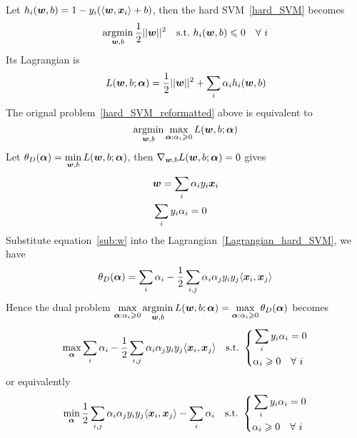 Let $h_i(\boldsymbol{w}, b) = 1 - y_i(\langle \boldsymbol{w}, \boldsymbol{x}_i\rangle + b)$, then the hard SVM~\eqref{hard_SVM} becomes
\begin{equation}\label{hard_SVM_reformatted}
\operatorname*{argmin}_{\boldsymbol{w},b} \frac{1}{2}||\boldsymbol{w}||^2\quad\text{s.t.\ } h_i(\boldsymbol{w}, b) \leqslant 0\quad\forall~i
\end{equation}
Its Lagrangian is
\begin{equation}\label{Lagrangian_hard_SVM}
    L(\boldsymbol{w}, b; \boldsymbol{\alpha}) = \frac{1}{2}||\boldsymbol{w}||^2 + \sum_i \alpha_i h_i(\boldsymbol{w}, b)
\end{equation}
The orignal problem~\eqref{hard_SVM_reformatted} above is equivalent to
$$\operatorname*{argmin}_{\boldsymbol{w}, b}\max_{\boldsymbol{\alpha}: \alpha_i \geqslant 0} L(\boldsymbol{w}, b; \boldsymbol{\alpha})$$
Let $\displaystyle\theta_D(\boldsymbol{\alpha}) = \min_{\boldsymbol{w}, b}L(\boldsymbol{w}, b; \boldsymbol{\alpha})$, then 
$\nabla_{\boldsymbol{w}, b} L(\boldsymbol{w}, b; \boldsymbol{\alpha}) = 0$ gives
\begin{subequations}
    \begin{align}
    &\boldsymbol{w} = \sum_i \alpha_i y_i \boldsymbol{x}_i\label{sub:w}\\
    &\sum_i y_i \alpha_i = 0\label{sub:b}
    \end{align}
\end{subequations}
Substitute equation~\eqref{sub:w} into the Lagrangian~\eqref{Lagrangian_hard_SVM}, we have
\begin{equation}
    \theta_D(\boldsymbol{\alpha}) = \sum_i \alpha_i - \frac{1}{2}\sum_{i, j}\alpha_i\alpha_j y_i y_j\langle \boldsymbol{x}_i, 
    \boldsymbol{x}_j\rangle
\end{equation}
Hence the dual problem $\displaystyle \max_{\boldsymbol{\alpha}: \alpha_i \geqslant 0} \operatorname*{argmin}_{\boldsymbol{w}, b}
L(\boldsymbol{w}, b; \boldsymbol{\alpha}) = \max_{\boldsymbol{\alpha}: \alpha_i \geqslant 0}\theta_D(\boldsymbol{\alpha})$ becomes
\begin{equation*}
    \max_{\boldsymbol{\alpha}}\sum_i \alpha_i - \frac{1}{2}\sum_{i, j}\alpha_i\alpha_j y_i y_j\langle \boldsymbol{x}_i, \boldsymbol{x}_j
    \rangle\quad\text{s.t.\ } \left\{
    \begin{aligned}
    &\sum_i y_i \alpha_i = 0\\
    &\alpha_i \geqslant 0\quad\forall~i
    \end{aligned}\right.
\end{equation*}
or equivalently
\begin{equation}\label{dual_hard_SVM}
    \min_{\boldsymbol{\alpha}}\frac{1}{2}\sum_{i, j}\alpha_i\alpha_j y_i y_j\langle \boldsymbol{x}_i, \boldsymbol{x}_j\rangle -
    \sum_i \alpha_i \quad\text{s.t.\ } \left\{
    \begin{aligned}
        &\sum_i y_i \alpha_i = 0\\
        &\alpha_i \geqslant 0\quad\forall~i
        \end{aligned}\right.
\end{equation}
